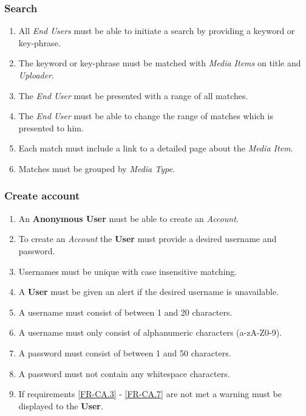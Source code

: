 

%

\subsubsection {Search}

\begin{enumerate}[label=\textbf{FR-\twodigits*}]

	\item All \textit{End Users} must be able to initiate a search by providing a keyword or key-phrase.
	\item The keyword or key-phrase must be matched with \textit{Media Items} on title and \textit{Uploader}.
	\item The \textit{End User} must be presented with a range of all matches.
	\item The \textit{End User} must be able to change the range of matches which is presented to him.
	\item Each match must include a link to a detailed page about the \textit{Media Item}.
	\item Matches must be grouped by \textit{Media Type}. 
\end{enumerate}	
			
\subsubsection{Create account}

\begin{enumerate}[label=\textbf{FR-\twodigits*}, resume]
	\item An \textbf{Anonymous User} must be able to create an \textit{Account}.
	\item To create an \textit{Account} the \textbf{User} must provide a desired username and password.
	\item Usernames must be unique with case insensitive matching. \label{FR-CA.3}
	\item A \textbf{User} must be given an alert if the desired username is unavailable.
	\item A username must consist of between 1 and 20 characters.
	\item A username must only consist of alphanumeric characters (a-zA-Z0-9).
	\item A password must consist of between 1 and 50 characters. 
	\label{FR-CA.6}
	\item A password must not contain any whitespace characters. \label{FR-CA.7}
	\item If requirements \ref{FR-CA.3} - \ref{FR-CA.7} are not met a warning must be displayed to the \textbf{User}.
\end{enumerate}
	
